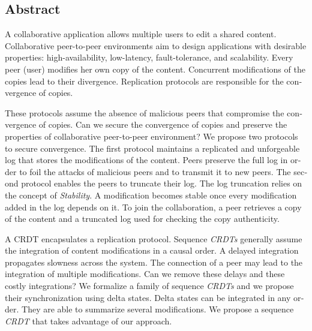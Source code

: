 \begin{ThesisAbstract}
\begin{otherlanguage}{english}
\subsection*{\centering Abstract}

A collaborative application allows multiple users to edit a shared content.
Collaborative peer-to-peer environments aim to design applications with desirable properties: high-availability, low-latency, fault-tolerance, and scalability.
Every peer (user) modifies her own copy of the content.
Concurrent modifications of the copies lead to their divergence.
Replication protocols are responsible for the convergence of copies.

These protocols assume the absence of malicious peers that compromise the convergence of copies.
Can we secure the convergence of copies and preserve the properties of collaborative peer-to-peer environment?
We propose two protocols to secure convergence.
The first protocol maintains a replicated and unforgeable log that stores the modifications of the content.
Peers preserve the full log in order to foil the attacks of malicious peers and to transmit it to new peers.
The second protocol enables the peers to truncate their log.
The log truncation relies on the concept of \emph{Stability}.
A modification becomes stable once every modification added in the log depends on it.
To join the collaboration, a peer retrieves a copy of
the content and a truncated log used for checking the copy authenticity.

A \acf{CRDT} encapsulates a replication protocol.
Sequence \emph{CRDTs} generally assume the integration of content modifications in a causal order.
A delayed integration propagates slowness across the system.
The connection of a peer may lead to the integration of multiple modifications.
Can we remove these delays and these costly integrations?
We formalize a family of sequence \emph{CRDTs} and we propose their synchronization using delta states.
Delta states can be integrated in any order.
They are able to summarize several modifications.
We propose a sequence \emph{CRDT} that takes advantage of our approach.
\end{otherlanguage}
\end{ThesisAbstract}